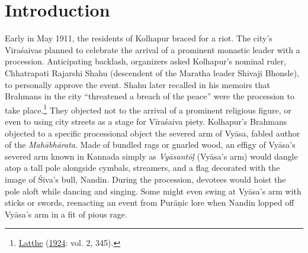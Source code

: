 
\setcounter{page}{33}


\raggedbottom
      
\section{Introduction}
      Early in May 1911, the residents of Kolhapur braced for a riot. The city’s Vīraśaivas planned to celebrate the arrival of a prominent monastic leader with a procession. Anticipating backlash, organizers asked Kolhapur’s nominal ruler, Chhatrapati Rajarshi Shahu (descendent of the Maratha leader Shivaji Bhonsle), to personally approve the event. Shahu later recalled in his memoirs that Brahmans in the city “threatened a breach of the peace” were the procession to take place.\footnote{%
\hyperref[Latthe1924]{Latthe} (\hyperref[Latthe1924]{1924}: vol. 2, 345).
}
 They objected not to the arrival of a prominent religious figure, or even to using city streets as a stage for Vīraśaiva piety. Kolhapur’s Brahmans objected to a specific processional object  \Dash  the severed arm of Vyāsa, fabled author of the \emph{Mahābhārata}. Made of bundled rags or gnarled wood, an effigy of Vyāsa’s severed arm  \Dash  known in Kannada simply as \emph{Vyāsantōḷ} (Vyāsa’s arm)  \Dash  would dangle atop a tall pole alongside cymbals, streamers, and a flag decorated with the image of Śiva’s bull, Nandin. During the procession, devotees would hoist the pole aloft while dancing and singing. Some might even swing at Vyāsa’s arm with sticks or swords, reenacting an event from Purāṇic lore when Nandin lopped off Vyāsa’s arm in a fit of pious rage.


